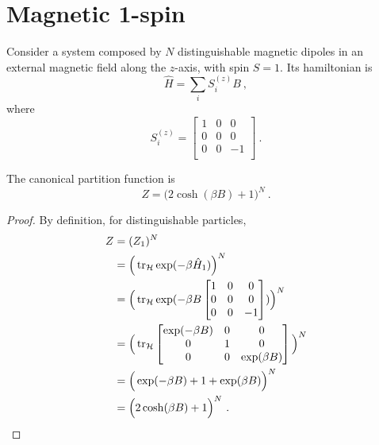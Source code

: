 \section{Magnetic 1-spin}

    Consider a system composed by $N$ distinguishable magnetic dipoles in an external magnetic field along the $z$-axis, with spin $S = 1$. Its hamiltonian is 
    \begin{equation*}
        \hat H = \sum_i S^{(z)}_i B ~,
    \end{equation*}
    where
    \begin{equation*}
        S^{(z)}_i = \begin{bmatrix}
            1 & 0 & 0 \\
            0 & 0 & 0 \\
            0 & 0 & - 1 \\
        \end{bmatrix} ~.
    \end{equation*}

    The canonical partition function is 
    \begin{equation*}
        Z = \Big ( 2 \cosh (\beta B) + 1 \Big)^N ~.
    \end{equation*}
    \begin{proof}
        By definition, for distinguishable particles,
        \begin{equation*}
        \begin{aligned}
            Z & = (Z_1)^N \\ & = \Big (\operatorname{tr}_{\mathcal H} \exp(- \beta \hat H_1) \Big)^N \\ & = \Big (\operatorname{tr}_{\mathcal H} \exp(- \beta B \begin{bmatrix}
                1 & 0 & 0 \\ 0 & 0 & 0 \\ 0 & 0 & - 1 \\ 
            \end{bmatrix}) \Big)^N \\ & = \Big(\operatorname{tr}_{\mathcal H} \begin{bmatrix}
                \exp(- \beta B) & 0 & 0 \\ 0 & 1 & 0 \\ 0 & 0 & \exp(\beta B) \\ 
            \end{bmatrix} \Big )^N \\ & = \Big( \exp(- \beta B) + 1 + \exp(\beta B) \Big)^N \\ & = \Big ( 2 \cosh (\beta B) + 1 \Big)^N ~.
        \end{aligned}
        \end{equation*}
    \end{proof}


